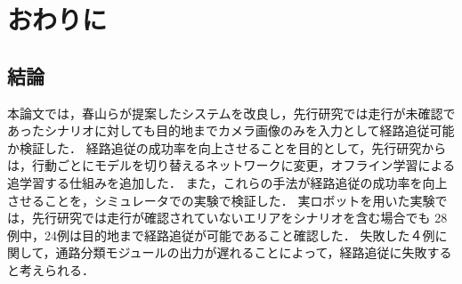 \chapter{おわりに}
\label{chap:end}
\section{結論}
本論文では，春山らが提案したシステムを改良し，先行研究では走行が未確認であったシナリオに対しても目的地までカメラ画像のみを入力として経路追従可能か検証した．
経路追従の成功率を向上させることを目的として，先行研究からは，行動ごとにモデルを切り替えるネットワークに変更，オフライン学習による追学習する仕組みを追加した．
また，これらの手法が経路追従の成功率を向上させることを，シミュレータでの実験で検証した．
実ロボットを用いた実験では，先行研究では走行が確認されていないエリアをシナリオを含む場合でも 28 例中，24例は目的地まで経路追従が可能であること確認した．
失敗した４例に関して，通路分類モジュールの出力が遅れることによって，経路追従に失敗すると考えられる．